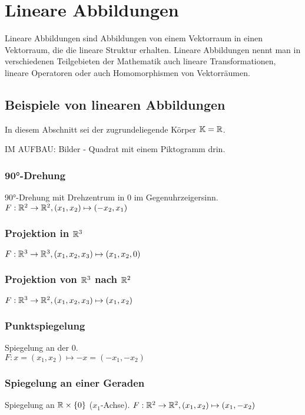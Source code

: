 \section{Lineare Abbildungen}

Lineare Abbildungen sind Abbildungen von einem Vektorraum in einen Vektorraum, die die lineare Struktur erhalten. Lineare Abbildungen nennt man in verschiedenen Teilgebieten der Mathematik auch lineare Transformationen, lineare Operatoren oder auch Homomorphismen von Vektorräumen.  

\subsection{Beispiele von linearen Abbildungen}
In diesem Abschnitt sei der zugrundeliegende Körper $ \mathbb K = \mathbb R $.

IM AUFBAU: Bilder - Quadrat mit einem Piktogramm drin. 

\subsubsection{90°-Drehung}
	90°-Drehung mit Drehzentrum in $ 0 $ im Gegenuhrzeigersinn.\\
	$ F: \mathbb R^2 \to \mathbb R^2, (x_1,x_2) \mapsto (-x_2,x_1) $

\subsubsection{Projektion in $ \mathbb R^3 $}
	$ F : \mathbb R^3 \to \mathbb R^3, (x_1,x_2,x_3) \mapsto (x_1, x_2, 0) $

\subsubsection{Projektion von $ \mathbb R^3 $  nach $ \mathbb R^2 $ }
	$ F : \mathbb R^3 \to \mathbb R^2, (x_1,x_2,x_3) \mapsto (x_1, x_2) $

\subsubsection{Punktspiegelung}
	Spiegelung an der $ 0 $.\\
	$ F : x = (x_1, x_2) \mapsto -x = (-x_1, -x_2) $
	
\subsubsection{Spiegelung an einer Geraden}
	Spiegelung an $ \mathbb R \times \{0\} $ ($ x_1 $-Achse).
	$ F: \mathbb R^2 \to \mathbb R^2, (x_1, x_2) \mapsto (x_1, -x_2) $

